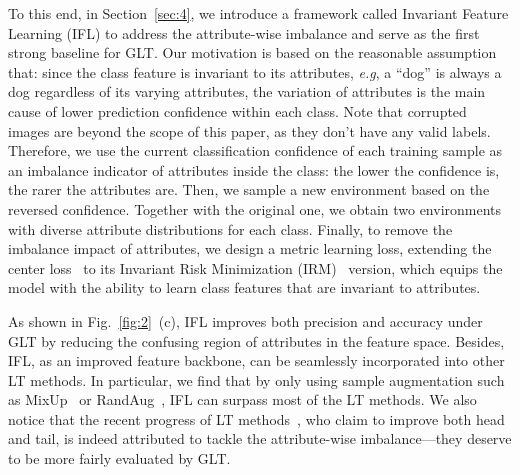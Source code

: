 \documentclass{article}
\def\eg{\emph{e.g}} \def\Eg{\emph{E.g}}
\begin{document}
To this end, in Section~\ref{sec:4}, we introduce a framework called Invariant Feature Learning (IFL) to address the attribute-wise imbalance and serve as the first strong baseline for GLT. Our motivation is based on the reasonable assumption that: since the class feature is invariant to its attributes, \eg, a ``dog'' is always a dog regardless of its varying attributes, the variation of attributes is the main cause of lower prediction confidence within each class. Note that corrupted images are beyond the scope of this paper, as they don't have any valid labels. Therefore, we use the current classification confidence of each training sample as an imbalance indicator of attributes inside the class: the lower the confidence is, the rarer the attributes are. Then, we sample a new environment based on the reversed confidence. Together with the original one, we obtain two environments with diverse attribute distributions for each class. Finally, to remove the imbalance impact of attributes, we design a metric learning loss, extending the center loss~\cite{wen2016centerloss} to its Invariant Risk Minimization (IRM)~\cite{arjovsky2019invariant} version, which equips the model with the ability to learn class features that are invariant to attributes. 






As shown in Fig.~\ref{fig:2}~(c), IFL improves both precision and accuracy under GLT by reducing the confusing region of attributes in the feature space. Besides, IFL, as an improved feature backbone, can be seamlessly incorporated into other LT methods. In particular, we find that by only using sample augmentation such as MixUp~\cite{zhang2018mixup} or RandAug~\cite{cubuk2020randaugment}, IFL can surpass most of the LT methods. We also notice that the recent progress of LT methods~\cite{wang2020long,zhang2021test,zhu2021cross}, who claim to improve both head and tail, is indeed attributed to tackle the attribute-wise imbalance---they deserve to be more fairly evaluated by GLT. 
\end{document}
